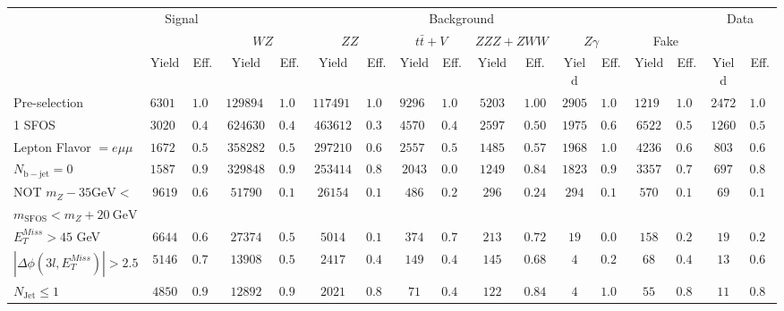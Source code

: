 \begin{tabular}{l||c|c||c|c||c|c||c|c||c|c||c|c||c|c||c|c}
\hline
 &                 \multicolumn{2}{c||}{Signal}            &  \multicolumn{12}{c||}{Background} &  \multicolumn{2}{c}{Data} \\
 & &  & \multicolumn{2}{c||}{$WZ$} & \multicolumn{2}{c||}{$ZZ$} & \multicolumn{2}{c||}{$t\bar{t}+V$} & \multicolumn{2}{c||}{$ZZZ+ZWW$} & \multicolumn{2}{c||}{$Z\gamma$} & \multicolumn{2}{c||}{Fake} &  & \\ 
 & Yield & Eff. & Yield & Eff. & Yield & Eff. & Yield & Eff. & Yield & Eff. & Yield & Eff. & Yield & Eff. & Yield & Eff.\\
\hline\hline
Pre-selection &  $63019$ &  $1.00$ &  $1298941$ &  $1.00$ &  $1174916$ &  $1.00$ &  $92968$ &  $1.00$ &  $5203$ &  $1.00$ &  $2905$ &  $1.00$ &  $12192$ &  $1.00$ &  $2472$ &  $1.00$\\ 
\hline
1 SFOS &  $30204$ &  $0.48$ &  $624630$ &  $0.48$ &  $463612$ &  $0.39$ &  $45701$ &  $0.49$ &  $2597$ &  $0.50$ &  $1975$ &  $0.68$ &  $6522$ &  $0.53$ &  $1260$ &  $0.51$\\ 
\hline
Lepton Flavor $= e\mu\mu$ &  $16725$ &  $0.55$ &  $358282$ &  $0.57$ &  $297210$ &  $0.64$ &  $25578$ &  $0.56$ &  $1485$ &  $0.57$ &  $1968$ &  $1.00$ &  $4236$ &  $0.65$ &  $803$ &  $0.64$\\ 
\hline
$N_{\mathrm{b-jet}} = 0$ &  $15874$ &  $0.95$ &  $329848$ &  $0.92$ &  $253414$ &  $0.85$ &  $2043$ &  $0.08$ &  $1249$ &  $0.84$ &  $1823$ &  $0.93$ &  $3357$ &  $0.79$ &  $697$ &  $0.87$\\ 
\hline
NOT $m_Z - 35 \mathrm{GeV} <$ & \multirow{2}{*}{$9619$} &  \multirow{2}{*}{$0.61$} &  \multirow{2}{*}{$51790$} &  \multirow{2}{*}{$0.16$} &  \multirow{2}{*}{$26154$} &  \multirow{2}{*}{$0.10$} &  \multirow{2}{*}{$486$} &  \multirow{2}{*}{$0.24$} &  \multirow{2}{*}{$296$} &  \multirow{2}{*}{$0.24$} &  \multirow{2}{*}{$294$} &  \multirow{2}{*}{$0.16$} &  \multirow{2}{*}{$570$} &  \multirow{2}{*}{$0.17$} &  \multirow{2}{*}{$69$} &  \multirow{2}{*}{$0.10$}\\ 
$ m_{\mathrm{SFOS}} < m_Z + 20~\mathrm{GeV}$  & & & & & & & & & & & & & &  & \\
\hline
$E_{T}^{Miss} > 45$ GeV &  $6644$ &  $0.69$ &  $27374$ &  $0.53$ &  $5014$ &  $0.19$ &  $374$ &  $0.77$ &  $213$ &  $0.72$ &  $19$ &  $0.06$ &  $158$ &  $0.28$ &  $19$ &  $0.28$\\ 
\hline
$|\Delta\phi(3l,E_{T}^{Miss})| > 2.5$ &  $5146$ &  $0.77$ &  $13908$ &  $0.51$ &  $2417$ &  $0.48$ &  $149$ &  $0.40$ &  $145$ &  $0.68$ &  $4$ &  $0.21$ &  $68$ &  $0.43$ &  $13$ &  $0.68$\\ 
\hline
$N_{\mathrm{Jet}} \leq 1$ &  $4850$ &  $0.94$ &  $12892$ &  $0.93$ &  $2021$ &  $0.84$ &  $71$ &  $0.48$ &  $122$ &  $0.84$ &  $4$ &  $1.00$ &  $55$ &  $0.81$ &  $11$ &  $0.85$\\ 
\hline
\end{tabular}
